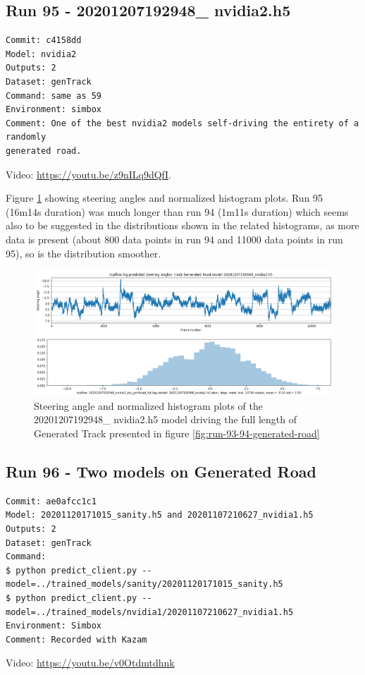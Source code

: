 \subsection{Run 95 - 20201207192948\_ nvidia2.h5 }
\label{app_res:95}
\begin{verbatim}
Commit: c4158dd
Model: nvidia2
Outputs: 2
Dataset: genTrack   
Command: same as 59
Environment: simbox
Comment: One of the best nvidia2 models self-driving the entirety of a randomly
generated road.

\end{verbatim}
Video: \url{https://youtu.be/z9nILq9dQfI}.

Figure \ref{fig:20201207192948_nvidia2_dry_genRoad_full} showing steering angles and normalized histogram plots. Run 95 (16m14s duration) was much longer than run 94 (1m11s duration) which seems also to be suggested in the distributions shown in the related histograms, as more data is present (about 800 data points in run 94 and 11000 data points in run 95), so is the distribution smoother.
\begin{figure}[ht]
 \centering 
 \includegraphics[width=\textwidth]{Figures/20201207192948_nvidia2_dry_genRoad_full.png}
 \caption{Steering angle and normalized histogram plots of the 20201207192948\_ nvidia2.h5 model driving the full length of Generated Track presented in figure \ref{fig:run-93-94-generated-road} }
 \label{fig:20201207192948_nvidia2_dry_genRoad_full} 
\end{figure}

\subsection{Run 96 - Two models on Generated Road}
\label{app_res:96}
\begin{verbatim}
Commit: ae0afcc1c1
Model: 20201120171015_sanity.h5 and 20201107210627_nvidia1.h5
Outputs: 2
Dataset: genTrack
Command:
$ python predict_client.py --model=../trained_models/sanity/20201120171015_sanity.h5
$ python predict_client.py --model=../trained_models/nvidia1/20201107210627_nvidia1.h5
Environment: Simbox 
Comment: Recorded with Kazam
\end{verbatim}
Video: \url{https://youtu.be/v0Otdmtdhnk}

